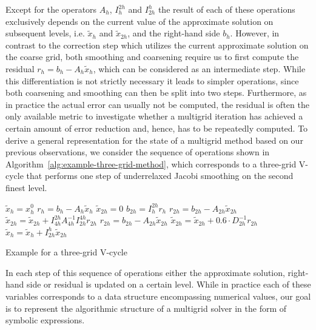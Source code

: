 Except for the operators $A_h$, $I_h^{2h}$ and $I_{2h}^h$ the result of each of these operations exclusively depends on the current value of the approximate solution on subsequent levels, i.e. $\tilde{x}_{h}$ and $\tilde{x}_{2h}$, and the right-hand side $b_h$.
However, in contrast to the correction step which utilizes the current approximate solution on the coarse grid, both smoothing and coarsening require us to first compute the residual $r_h = b_h - A_h \tilde{x}_h$, which can be considered as an intermediate step.
While this differentiation is not strictly necessary it leads to simpler operations, since both coarsening and smoothing can then be split into two steps.
Furthermore, as in practice the actual error can usually not be computed, the residual is often the only available metric to investigate whether a multigrid iteration has achieved a certain amount of error reduction and, hence, has to be repeatedly computed.
To derive a general representation for the state of a multigrid method based on our previous observations, we consider the sequence of operations shown in Algorithm~\ref{alg:example-three-grid-method}, which corresponds to a three-grid V-cycle that performs one step of underrelaxed Jacobi smoothing on the second finest level.
\begin{algorithm}
	\begin{algorithmic}[1]
		\State $\tilde{x}_{h} = x_{h}^0$
		\State $r_{h} = b_{h} - A_h \tilde{x}_{h} $
		\State $ \tilde{x}_{2h} = 0$
		\State $ b_{2h} = I_{h}^{2h} r_{h}$
		\State $ r_{2h} = b_{2h} - A_{2h} \tilde{x}_{2h}$
		\State $ \tilde{x}_{2h} = \tilde{x}_{2h} + I_{4h}^{2h} A_{4h}^{-1} I_{2h}^{4h} r_{2h}$
		\State $ r_{2h} = b_{2h} - A_{2h} \tilde{x}_{2h}$
		\State $ \tilde{x}_{2h} = \tilde{x}_{2h} + 0.6 \cdot D_{2h}^{-1} r_{2h}$
		\State $\tilde{x}_{h} = \tilde{x}_{h}  + I_{2h}^h \tilde{x}_{2h}$
	\end{algorithmic}
\caption{Example for a three-grid V-cycle}
\label{alg:example-three-grid-method}
\end{algorithm}
In each step of this sequence of operations either the approximate solution, right-hand side or residual is updated on a certain level.
While in practice each of these variables corresponds to a data structure encompassing numerical values, our goal is to represent the algorithmic structure of a multigrid solver in the form of symbolic expressions.
